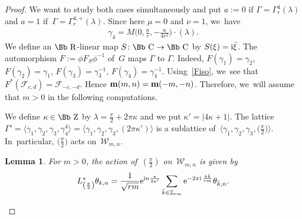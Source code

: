 \documentclass[10pt,a4paper]{amsart}
\newcommand\CC{{\mbox{\Bb C}}}
\newcommand\RR{{\mbox{\Bb R}}}
\newcommand\ZZ{{\mbox{\Bb Z}}}
\newcommand\Z{{\mathbb Z}}
\newcommand\bm{\textbf{{\rm \textbf{m}}}}
\newcommand\cF{{\mathcal F}}
\newcommand\la{\langle}
\newcommand\ra{\rangle}
\numberwithin{equation}{section}
\newtheorem{Lemma}[Theorem]{Lemma}
\begin{document}
\begin{proof}
We want to study both cases simultaneously and put $a:=0$ if $\Gamma=\Gamma_r^4(\lambda)$ and $a=1$ if~$\Gamma=\Gamma_r^{4,+}(\lambda)$. Since here $\mu=0$ and $\nu=1$, we~have
\begin{gather*}
\gamma_4= M\bigg(0, \frac ar,-\frac{a}{4r^2}\bigg)\cdot(\lambda).
\end{gather*}
We define an $\RR$-linear map $S\colon \CC\to\CC$ by $S(\xi)={\rm i}\bar\xi$. The automorphism $F:=\phi F_{S}\phi^{-1}$ of~$G$ maps $\Gamma$ to $\Gamma$. Indeed, $F(\gamma_1)=\gamma_2$, $F(\gamma_2)=\gamma_1$, $F(\gamma_3)=\gamma_3^{-1}$, $F(\gamma_4)=\gamma_4^{-1}$. Using~\eqref{Fiso}, we~see that $F^*(\cF_{c,d})=\cF_{-c,-d}$. Hence $\bm(m,n)=\bm(-m,-n)$. Therefore, we~will assume that $m>0$ in the following computations.

We define $\kappa\in\ZZ$ by $\lambda=\frac\pi2+2\pi\kappa$ and we put $\kappa'=|4\kappa+1|$.
The lattice $\Gamma'=\la \gamma_1,\gamma_2,\gamma_3,\gamma_4^4\ra=\la \gamma_1,\gamma_2,\gamma_3,(2\pi \kappa')\ra$ is a sublattice of~$\la \gamma_1,\gamma_2,\gamma_3,\big(\frac\pi2\big)\ra$. In~particular, $\big(\frac\pi2\big)$ acts on~${\mathcal W}_{m,n}$.
%
\begin{Lemma}
For $m>0$, the action of~$(\frac{\pi}{2})$ on~${\mathcal W}_{m,n}$ is given by
\begin{gather*}
L^*_{\left(\frac{\pi}{2}\right)}\theta_{k,n}= \frac{1}{\sqrt{rm}}{\rm e}^{{\rm i}n \frac{\pi}{2\kappa'}}\sum_{\bar k\in\Z_{rm}}{\rm e}^{-2\pi {\rm i}\, \frac{k\bar k}{rm}}\theta_{\bar k,n}.
\end{gather*}
\end{Lemma}


\end{proof}
\end{document}
